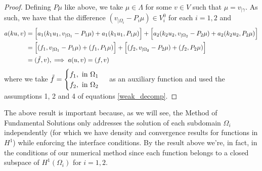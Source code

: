 \begin{proof}
    Defining \(P \mu\) like above, we take \(\mu \in \Lambda\) for some \(v \in V\) such that \(\mu = v_{|\gamma}\). As such, we have that the difference \((v_{|\Omega_i} - P_i \mu) \in V^0_i\) for each \(i=1, 2\) and
    \begin{align*}
        a(k u, v) &= \Big[a_1(k_1 u_1, v_{|\Omega_1} - P_1 \mu) + a_1(k_1 u_1, P_1\mu)\Big] + \Big[a_2(k_2 u_2, v_{|\Omega_2} - P_2 \mu) + a_2(k_2 u_2, P_2\mu)\Big]\\
        &=\Big[(f_1, v_{|\Omega_1} - P_1 \mu) + (f_1, P_1 \mu) \Big] + \Big[(f_2, v_{|\Omega_2} - P_2 \mu) + (f_2, P_2 \mu) \Big]\\
        &=(\Tilde{f}, v), \implies a(u, v) = (f, v)
    \end{align*}
    where we take \(\Tilde{f} = \begin{cases}
        f_1, \text{ in } \Omega_1\\
        f_2, \text{ in } \Omega_2
    \end{cases}\)
    as an auxiliary function and used the assumptions 1, 2 and 4 of equations \eqref{weak_decomp}.
\end{proof}

\begin{remark}
    The above result is important because, as we will see, the Method of Fundamental Solutions only addresses the solution of each subdomain \(\Omega_i\) independently (for which we have density and convergence results for functions in \(H^1\)) while enforcing the interface conditions. By the result above we're, in fact, in the conditions of our numerical method since each function belongs to a closed subspace of \(H^1(\Omega_i)\) for \(i=1, 2\).
\end{remark}



